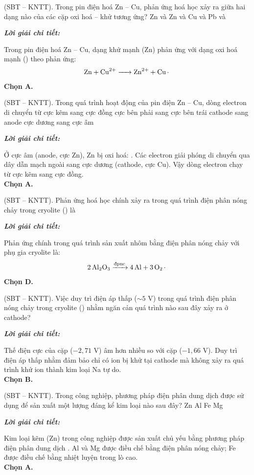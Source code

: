 \documentclass[11pt,a4paper]{article}
\def\loigiai#1{
\par\begingroup\color{blue!80!black}\small
\noindent\textbf{\textit{Lời giải chi tiết:}}\par
#1\par\endgroup}
\begin{document}
\begin{ex}
(SBT -- KNTT). Trong pin điện hoá Zn -- Cu, phản ứng hoá học xảy ra giữa hai dạng nào của các cặp oxi hoá -- khử tương ứng?
\choice
{\True Zn và }
{Zn và Cu}
{ và }
{Pb và }
\loigiai{
Trong pin điện hoá Zn -- Cu, dạng khử mạnh (Zn) phản ứng với dạng oxi hoá mạnh (\ce{Cu^2+}) theo phản ứng:
$$\ce{Zn + Cu^2+ -> Zn^2+ + Cu.}$$
\textbf{Chọn A.}}
\end{ex}

\begin{ex}
(SBT -- KNTT). Trong quá trình hoạt động của pin điện Zn -- Cu, dòng electron di chuyển từ
\choice
{\True cực kẽm sang cực đồng}
{cực bên phải sang cực bên trái}
{cathode sang anode}
{cực dương sang cực âm}
\loigiai{
Ở cực âm (anode, cực Zn), Zn bị oxi hoá: \ce{Zn -> Zn^2+ + 2e}. Các electron giải phóng di chuyển qua dây dẫn mạch ngoài sang cực dương (cathode, cực Cu). Vậy dòng electron chạy từ cực kẽm sang cực đồng.\\
\textbf{Chọn A.}}
\end{ex}

\begin{ex}
(SBT -- KNTT). Phản ứng hoá học chính xảy ra trong quá trình điện phân nóng chảy  trong cryolite () là
\choice
{}
{}
{}
{\True {}}
\loigiai{
Phản ứng chính trong quá trình sản xuất nhôm bằng điện phân nóng chảy \ce{Al2O3} với phụ gia cryolite là:
$$\ce{2Al2O3 ->[\text{đpnc}] 4Al + 3O2.}$$
\textbf{Chọn D.}}
\end{ex}

\begin{ex}
(SBT -- KNTT). Việc duy trì điện áp thấp ($\sim 5\text{ V}$) trong quá trình điện phân nóng chảy  trong cryolite () nhằm ngăn cản quá trình nào sau đây xảy ra ở cathode?
\choice
{}
{\True {}}
{}
{}
\loigiai{
Thế điện cực của cặp  ($-2{,}71\text{ V}$) âm hơn nhiều so với cặp \ce{Al^3+/Al} ($-1{,}66\text{ V}$). Duy trì điện áp thấp nhằm đảm bảo chỉ có ion \ce{Al^3+} bị khử tại cathode mà không xảy ra quá trình khử ion \ce{Na+} thành kim loại Na tự do.\\
\textbf{Chọn B.}}
\end{ex}

\begin{ex}
(SBT -- KNTT). Trong công nghiệp, phương pháp điện phân dung dịch được sử dụng để sản xuất một lượng đáng kể kim loại nào sau đây?
\choice
{\True Zn}
{Al}
{Fe}
{Mg}
\loigiai{
Kim loại kẽm (Zn) trong công nghiệp được sản xuất chủ yếu bằng phương pháp điện phân dung dịch \ce{ZnSO4}. Al và Mg được điều chế bằng điện phân nóng chảy; Fe được điều chế bằng nhiệt luyện trong lò cao.\\
\textbf{Chọn A.}}
\end{ex}
\end{document}
